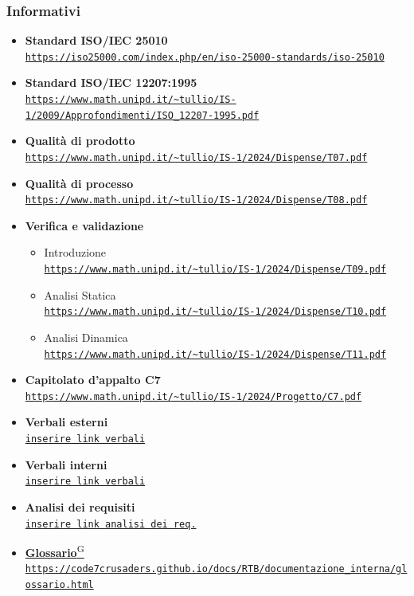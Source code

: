\documentclass{article}
\begin{document}
\subsubsection{Informativi}
\begin{itemize}
    \item \textbf{Standard ISO/IEC 25010} \\ \texttt{\url{https://iso25000.com/index.php/en/iso-25000-standards/iso-25010}}
    \item \textbf{Standard ISO/IEC 12207:1995} \\ \texttt{\url{https://www.math.unipd.it/~tullio/IS-1/2009/Approfondimenti/ISO_12207-1995.pdf}}
    \item \textbf{Qualità di prodotto} \\ \texttt{\url{https://www.math.unipd.it/~tullio/IS-1/2024/Dispense/T07.pdf}}
    \item \textbf{Qualità di processo} \\ \texttt{\url{https://www.math.unipd.it/~tullio/IS-1/2024/Dispense/T08.pdf}}
    \item \textbf{Verifica e validazione}
    \begin{itemize}
        \item Introduzione \\ \texttt{\url{https://www.math.unipd.it/~tullio/IS-1/2024/Dispense/T09.pdf}}
        \item Analisi Statica \\ \texttt{\url{https://www.math.unipd.it/~tullio/IS-1/2024/Dispense/T10.pdf}}
        \item Analisi Dinamica \\ \texttt{\url{https://www.math.unipd.it/~tullio/IS-1/2024/Dispense/T11.pdf}}
    \end{itemize}
    \item \textbf{Capitolato d'appalto C7} \\ \texttt{\url{https://www.math.unipd.it/~tullio/IS-1/2024/Progetto/C7.pdf}}
    \item \textbf{Verbali esterni} \\ \texttt{\url{inserire link verbali}}
    \item \textbf{Verbali interni} \\ \texttt{\url{inserire link verbali}}
    \item \textbf{Analisi dei requisiti} \\ \texttt{\url{inserire link analisi dei req.}}
    \item \href{https://code7crusaders.github.io/docs/RTB/documentazione_interna/glossario.html#glossario}{\textbf{Glossario}\textsuperscript{G}} \\ \texttt{\url{https://code7crusaders.github.io/docs/RTB/documentazione_interna/glossario.html}}
\end{itemize}
\newpage
\end{document}
